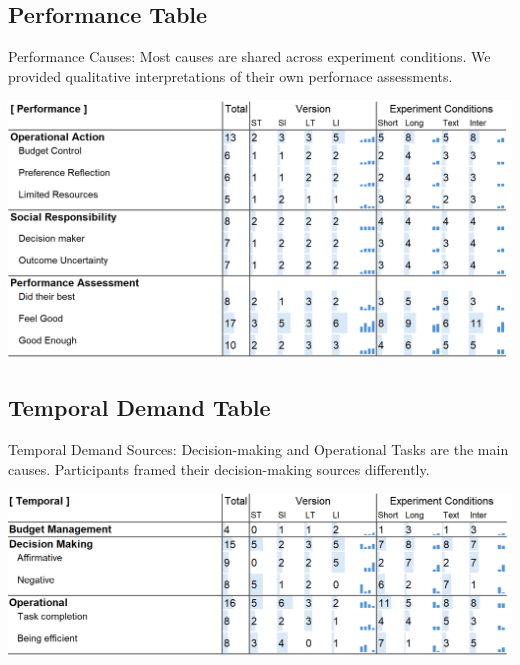 \subsection{Performance Table}
\label{apdx:perf_table}
\begin{table}[H]
    \caption{Performance Causes: Most causes are shared across experiment conditions. We provided qualitative interpretations of their own perfornace assessments.}
    \label{tbl:physical}
    \includegraphics[width=\linewidth]{content/image/cog/perf_table.png}
\end{table}

\subsection{Temporal Demand Table}
\label{apdx:temporal_table}
\begin{table}[H]
    \caption{Temporal Demand Sources: Decision-making and Operational Tasks are the main causes. Participants framed their decision-making sources differently.}
    \label{tbl:temporal}
    \includegraphics[width=\linewidth]{content/image/cog/temporal_table.png}
\end{table}

